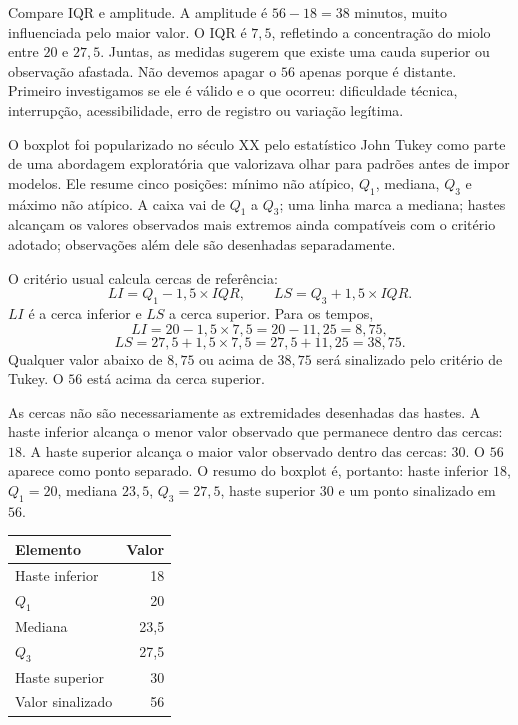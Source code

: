 Compare IQR e amplitude. A amplitude é $56-18=38$ minutos, muito influenciada pelo maior valor. O IQR é $7{,}5$, refletindo a concentração do miolo entre $20$ e $27{,}5$. Juntas, as medidas sugerem que existe uma cauda superior ou observação afastada. Não devemos apagar o $56$ apenas porque é distante. Primeiro investigamos se ele é válido e o que ocorreu: dificuldade técnica, interrupção, acessibilidade, erro de registro ou variação legítima.

O boxplot foi popularizado no século XX pelo estatístico John Tukey como parte de uma abordagem exploratória que valorizava olhar para padrões antes de impor modelos. Ele resume cinco posições: mínimo não atípico, $Q_1$, mediana, $Q_3$ e máximo não atípico. A caixa vai de $Q_1$ a $Q_3$; uma linha marca a mediana; hastes alcançam os valores observados mais extremos ainda compatíveis com o critério adotado; observações além dele são desenhadas separadamente.

O critério usual calcula cercas de referência:
\[
LI=Q_1-1{,}5\times IQR,
\qquad
LS=Q_3+1{,}5\times IQR.
\]
$LI$ é a cerca inferior e $LS$ a cerca superior. Para os tempos,
\[
LI=20-1{,}5\times7{,}5=20-11{,}25=8{,}75,
\]
\[
LS=27{,}5+1{,}5\times7{,}5=27{,}5+11{,}25=38{,}75.
\]
Qualquer valor abaixo de $8{,}75$ ou acima de $38{,}75$ será sinalizado pelo critério de Tukey. O $56$ está acima da cerca superior.

As cercas não são necessariamente as extremidades desenhadas das hastes. A haste inferior alcança o menor valor observado que permanece dentro das cercas: $18$. A haste superior alcança o maior valor observado dentro das cercas: $30$. O $56$ aparece como ponto separado. O resumo do boxplot é, portanto: haste inferior $18$, $Q_1=20$, mediana $23{,}5$, $Q_3=27{,}5$, haste superior $30$ e um ponto sinalizado em $56$.

\begin{center}
\small
\begin{tabular}{@{}lr@{}}
\toprule
\textbf{Elemento} & \textbf{Valor} \\
\midrule
Haste inferior & 18 \\
$Q_1$ & 20 \\
Mediana & 23,5 \\
$Q_3$ & 27,5 \\
Haste superior & 30 \\
Valor sinalizado & 56 \\
\bottomrule
\end{tabular}
\end{center}

